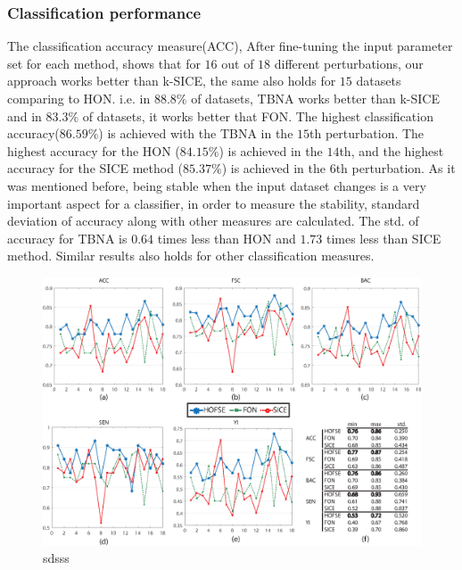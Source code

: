 \documentclass[journal]{IEEEtran}
\begin{document}
{	\subsubsection{Classification performance}
	The classification accuracy measure(ACC), After fine-tuning the input parameter set for each method, shows that for $16$ out of $18$ different perturbations, our approach works better than k-SICE, the same also holds for $15$ datasets comparing to HON. i.e. in $88.8 \%$ of datasets, TBNA works better than k-SICE and in $83.3 \%$ of datasets, it works better that FON.  
	The highest classification accuracy($86.59\%$) is achieved with the TBNA in the $15$th perturbation. The highest accuracy for the HON ($84.15\%$) is achieved in the $14$th, and the highest accuracy for the SICE method ($85.37\%$) is achieved in the $6$th perturbation. As it was mentioned before, being stable when the input dataset changes is a very important aspect for a classifier, in order to measure the stability, standard deviation of accuracy along with other measures are
	calculated. The std. of accuracy for TBNA is $0.64$ times less than HON and $1.73$ times less than SICE method. Similar results also holds for other classification measures.
	\begin{figure}
		\centering
		\includegraphics[width=7in]{Final}
		\caption{
			sdsss 
		}
		\label{g3.2}
	\end{figure}
	
}
\end{document}
